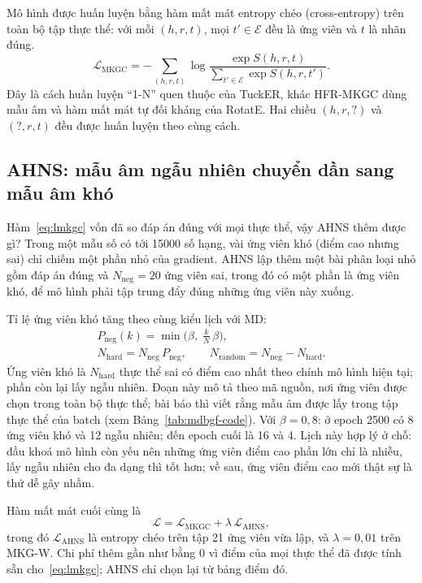 \documentclass[conference,a4paper]{IEEEtran}
\begin{document}
Mô hình được huấn luyện bằng hàm mất mát entropy chéo (cross-entropy) trên toàn bộ tập thực thể: với mỗi $(h, r, t)$, mọi $t' \in \mathcal{E}$ đều là ứng viên và $t$ là nhãn đúng.
\begin{equation}
\mathcal{L}_{\mathrm{MKGC}} = -\sum_{(h,r,t)} \log \frac{\exp S(h,r,t)}{\sum_{t' \in \mathcal{E}} \exp S(h,r,t')}.
\label{eq:lmkgc}
\end{equation}
Đây là cách huấn luyện ``1-N'' quen thuộc của TuckER, khác HFR-MKGC dùng mẫu âm và hàm mất mát tự đối kháng của RotatE. Hai chiều $(h,r,?)$ và $(?,r,t)$ đều được huấn luyện theo cùng cách.

\subsection{AHNS: mẫu âm ngẫu nhiên chuyển dần sang mẫu âm khó}
\label{sec:mdbgf-ahns}

Hàm~\eqref{eq:lmkgc} vốn đã so đáp án đúng với mọi thực thể, vậy AHNS thêm được gì? Trong một mẫu số có tới 15000 số hạng, vài ứng viên khó (điểm cao nhưng sai) chỉ chiếm một phần nhỏ của gradient. AHNS lập thêm một bài phân loại nhỏ gồm đáp án đúng và $N_{\mathrm{neg}} = 20$ ứng viên sai, trong đó có một phần là ứng viên khó, để mô hình phải tập trung đẩy đúng những ứng viên này xuống.

Tỉ lệ ứng viên khó tăng theo cùng kiểu lịch với MD:
\begin{equation}
\begin{gathered}
P_{\mathrm{neg}}(k) = \min\!\Big(\beta,\; \frac{k}{N}\,\beta\Big),\\
N_{\mathrm{hard}} = N_{\mathrm{neg}}\,P_{\mathrm{neg}}, \qquad
N_{\mathrm{random}} = N_{\mathrm{neg}} - N_{\mathrm{hard}}.
\end{gathered}
\label{eq:pneg}
\end{equation}
Ứng viên khó là $N_{\mathrm{hard}}$ thực thể sai có điểm cao nhất theo chính mô hình hiện tại; phần còn lại lấy ngẫu nhiên. Đoạn này mô tả theo mã nguồn, nơi ứng viên được chọn trong toàn bộ thực thể; bài báo thì viết rằng mẫu âm được lấy trong tập thực thể của batch (xem Bảng~\ref{tab:mdbgf-code}). Với $\beta = 0{,}8$: ở epoch 2500 có 8 ứng viên khó và 12 ngẫu nhiên; đến epoch cuối là 16 và 4. Lịch này hợp lý ở chỗ: đầu khoá mô hình còn yếu nên những ứng viên điểm cao phần lớn chỉ là nhiễu, lấy ngẫu nhiên cho đa dạng thì tốt hơn; về sau, ứng viên điểm cao mới thật sự là thứ dễ gây nhầm.

Hàm mất mát cuối cùng là
\begin{equation}
\mathcal{L} = \mathcal{L}_{\mathrm{MKGC}} + \lambda\,\mathcal{L}_{\mathrm{AHNS}},
\label{eq:ltotal}
\end{equation}
trong đó $\mathcal{L}_{\mathrm{AHNS}}$ là entropy chéo trên tập 21 ứng viên vừa lập, và $\lambda = 0{,}01$ trên MKG-W. Chi phí thêm gần như bằng 0 vì điểm của mọi thực thể đã được tính sẵn cho~\eqref{eq:lmkgc}; AHNS chỉ chọn lại từ bảng điểm đó.
\end{document}

